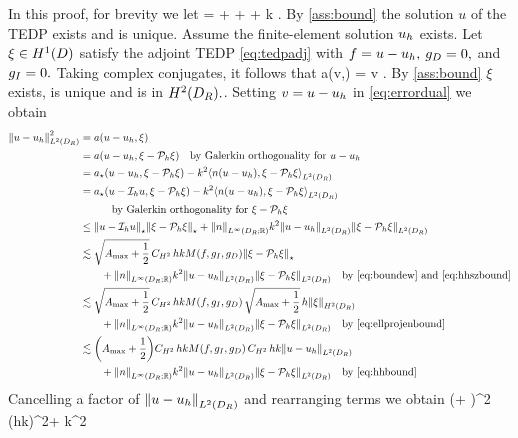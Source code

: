 In this proof, for brevity we let
\beqs
\Mfg =  + \Nunsure{\gI} + \NLtGD{\gradGD \gD} + k \NLtGD{\gD}.
\eeqs
By \cref{ass:bound} the solution $u$ of the TEDP exists and is unique. Assume the finite-element solution $u_{h}$ exists. Let $\xi \in \HoD$ satisfy the adjoint TEDP \eqref{eq:tedpadj} with $f=u-u_{h},$ $g_{D}=0,$ and $g_{I}=0.$ Taking complex conjugates, it follows that
\beq\label{eq:errordual}
a(v,\xi) =  \tfa v \in \HoDR.
\eeq
By \cref{ass:bound} $\xi$ exists, is unique and is in $\HtDR.$. Setting $v = u-u_{h}$ in \eqref{eq:errordual} we obtain
\begin{align*}
  \NLtDR{u-\uh}^2 &= a\mleft(u-\uh,\xi\mright)\\
                 &= a\mleft(u-\uh,\xi-\Ph \xi\mright) \quad\text{by Galerkin orthogonality for } u-\uh\\
                 &= \api\mleft(u-\uh,\xi-\Ph \xi\mright) - k^2 \IPLtDR{n\mleft(u-\uh\mright)}{\xi-\Ph \xi}\\
                 &= \api\mleft(u-\Ih u,\xi-\Ph \xi\mright) - k^2 \IPLtDR{n\mleft(u-\uh\mright)}{\xi-\Ph \xi}\\
  &\quad\quad\quad\text{by Galerkin orthogonality for }\xi  - \Ph \xi\\
                 &\leq \Npi{u-\Ih u}\Npi{\xi - \Ph \xi} + \NLiDRRR{n} k^2 \NLtDR{u-\uh}\NLtDR{\xi-\Ph \xi}\\
                 &\lesssim \sqrt{\Amax + \half}\, \CHthh\, hk \Mfg\Npi{\xi-\Ph \xi}\\
  &\quad\quad+  \NLiDRRR{n} k^2 \NLtDR{u-\uh}\NLtDR{\xi-\Ph \xi}\quad \text{by \eqref{eq:boundew} and \eqref{eq:hhszbound}}\\
                 &\lesssim \sqrt{\Amax + \half}\, \CHthh\, hk\Mfg\,\sqrt{\Amax + \half}\,h\NHtDR{\xi}\\
                 &\quad\quad  + \NLiDRRR{n} k^2 \NLtDR{u-\uh}\NLtDR{\xi-\Ph \xi}\quad \text{by \eqref{eq:ellprojenbound}}\\
                 &\lesssim \mleft(\Amax + \half\mright)\CHthh\, hk\Mfg \, \CHthh \,hk \NLtDR{u-\uh}\\
&\quad\quad  + \NLiDRRR{n} k^2 \NLtDR{u-\uh}\NLtDR{\xi-\Ph \xi}\quad \text{by \eqref{eq:hhbound}}\\
\end{align*}
Cancelling a factor of $\NLtDR{u-\uh}$ and rearranging terms we obtain
\beqs
{} \lesssim \mleft(\Amax + \half\mright)\CHthh^2 \mleft(hk\mright)^2\Mfg + k^2  \NLtDR{\xi - \Ph \xi}
\eeqs
